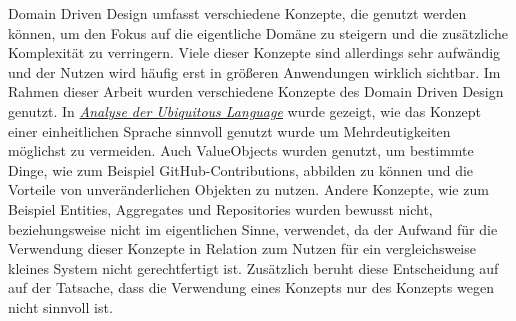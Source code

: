 \documentclass[12pt]{article}
\begin{document}
Domain Driven Design umfasst verschiedene Konzepte, die genutzt werden können, um den Fokus auf die eigentliche Domäne zu steigern und die zusätzliche Komplexität zu verringern.
Viele dieser Konzepte sind allerdings sehr aufwändig und der Nutzen wird häufig erst in größeren Anwendungen wirklich sichtbar.
Im Rahmen dieser Arbeit wurden verschiedene Konzepte des Domain Driven Design genutzt.
In \hyperref[sec:ubiq_lang]{\textit{Analyse der Ubiquitous Language}} wurde gezeigt, wie das Konzept einer einheitlichen Sprache sinnvoll genutzt wurde um Mehrdeutigkeiten möglichst zu vermeiden.
Auch ValueObjects wurden genutzt, um bestimmte Dinge, wie zum Beispiel GitHub-Contributions, abbilden zu können und die Vorteile von unveränderlichen Objekten zu nutzen.
Andere Konzepte, wie zum Beispiel Entities, Aggregates und Repositories wurden bewusst nicht, beziehungsweise nicht im eigentlichen Sinne, verwendet, da der Aufwand für die Verwendung dieser Konzepte in Relation zum Nutzen für ein vergleichsweise kleines System nicht gerechtfertigt ist.
Zusätzlich beruht diese Entscheidung auf auf der Tatsache, dass die Verwendung eines Konzepts nur des Konzepts wegen nicht sinnvoll ist.
\end{document}
